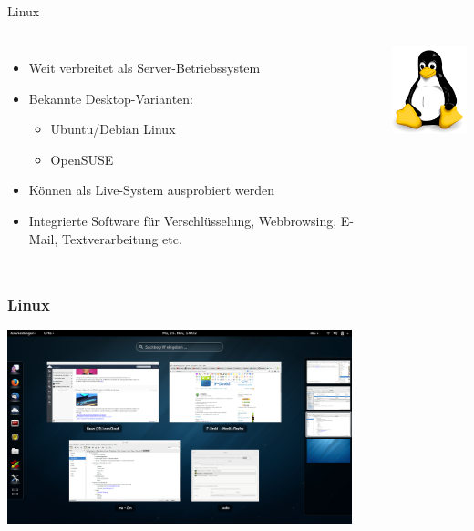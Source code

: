 \documentclass[12pt]{beamer}
\begin{document}
\subsection{}
\begin{frame}{Linux}

\begin{columns}


\column{8cm}
\begin{itemize}
\item Weit verbreitet als Server-Betriebssystem
\item Bekannte Desktop-Varianten: 

\begin{itemize}
\item Ubuntu/Debian Linux
\item OpenSUSE
\end{itemize}
\item Können als Live-System ausprobiert werden
\item Integrierte Software für Verschlüsselung, Webbrowsing, E-Mail, Textverarbeitung
etc.
\end{itemize}

\column{6cm}


\begin{center}
\includegraphics[width=3cm]{img/Tux}
\par\end{center}

\end{columns}
\end{frame}

\begin{frame}
  \frametitle{Linux}
  \begin{center}
    \includegraphics[width=10cm]{img/gnome}
  \par\end{center}
\end{frame}
\end{document}
